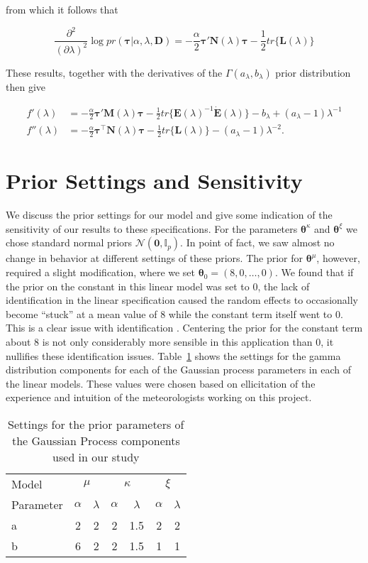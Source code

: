 \documentclass[11pt,english]{article}
\newcommand{\bs}[1]{\boldsymbol{#1}}
\newcommand{\mc}[1]{\mathcal{#1}}
\newcommand{\pderivsq}[1]{\frac{\partial^2}{(\partial #1)^2}}
\newcommand{\bl}{\begin{linenomath}}
\newcommand{\el}{\end{linenomath}}
\begin{document}
from which it follows that 
\bl\[
\pderivsq{\lambda} \log pr(\bs{\tau}|\alpha,\lambda, \bs{D}) = - \frac{\alpha}{2} \bs{\tau}'\bs{N}(\lambda)\bs{\tau} -\frac{1}{2}tr\{\bs{L}(\lambda)\} 
\]\el
These results, together with the derivatives of the $\Gamma (a_\lambda, b_\lambda)$ prior distribution then give 
\bl\begin{align*}
f'(\lambda) &= - \frac{\alpha}{2}\bs{\tau}'\bs{M}(\lambda)\bs{\tau} -\frac{1}{2}tr\Big\{\bs{E}(\lambda)^{-1}\dot{\bs{E}}(\lambda)\Big\}  - b_\lambda + (a_\lambda - 1)\lambda^{-1}\\
f''(\lambda) &=  - \frac{\alpha}{2} \bs{\tau}^\top\bs{N}(\lambda) \bs{\tau} -\frac{1}{2} tr\{\bs{L}(\lambda)\} - (a_\lambda - 1)\lambda^{-2}.
\end{align*}\el

\section{Prior Settings and Sensitivity}
We discuss the prior settings for our model and give some indication of the sensitivity of our results to these specifications.  For the parameters $\bs{\theta}^\kappa$ and $\bs{\theta}^{\xi}$ we chose standard normal priors $\mc{N}(\bs{0}, \mathbb{I}_p)$.  In point of fact, we saw almost no change in behavior at different settings of these priors.  The prior for $\bs{\theta}^{\mu}$, however, required a slight modification, where we set $\bs{\theta}_0 = (8,0,\dots,0)$.  We found that if the prior on the constant in this linear model was set to $0$, the lack of identification in the linear specification caused the random effects to occasionally become ``stuck'' at a mean value of $8$ while the constant term itself went to $0$. This is a clear issue with identification \citep[see][for a detailed study of these sorts of issues]{vandyk_meng_2001}.  Centering the prior for the constant term about $8$ is not only considerably more sensible in this application than $0$, it nullifies these identification issues.
Table~\ref{tab:gp_prior} shows the settings for the gamma distribution components for each of the Gaussian process parameters in each of the linear models.  These values were chosen based on ellicitation of the experience and intuition of the meteorologists working on this project.
\begin{table}[htp]
\caption{Settings for the prior parameters of the Gaussian Process components used in our study}\label{tab:gp_prior}
\begin{center}
\begin{tabular}{l|cc|cc|cc|}
\hline\hline
Model&\multicolumn{2}{c|}{$\mu$}&\multicolumn{2}{c|}{$\kappa$}&\multicolumn{2}{c|}{$\xi$}\\
Parameter
& $\alpha$ & $\lambda$ & $\alpha$ & $\lambda$ & $\alpha$ & $\lambda$\\
\hline
a &  2 & 2 & 2 & 1.5 & 2 & 2\\
b & 6 & 2 & 2 & 1.5 & 1 & 1\\
\hline
\end{tabular}
\end{center}
\end{table}
\end{document}
